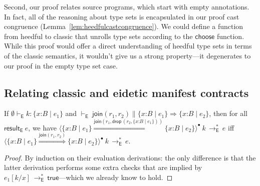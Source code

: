 \documentclass[9pt]{extarticle}
\newcommand{\ottnt}[1]{\mathit{#1}}
\newcommand{\ottsym}[1]{#1}
\begin{document}
{Second, our proof relates source programs, which start with empty
annotations. In fact, all of the reasoning about type sets is encapsulated
in our proof cast congruence\iffull
(Lemma~\ref{lem:heedfulcastcongruence})\fi. 
We could define a function from heedful \lambdah to classic \lambdah
that unrolls type sets according to the $ \mathsf{choose} $ function. While
this proof would offer a direct understanding of heedful \lambdah
type sets in terms of the classic semantics, it wouldn't give us a
strong property---it degenerates to our proof in the empty type set
case.

\subsection{Relating  classic and eidetic manifest contracts}
\label{sec:eideticlr}

\fi}

\begin{lemma}
  \label{lem:eideticcoercionidempotent}
  If $ \emptyset   \vdash _{  \mathsf{E}  }  \ottnt{k}  :   \{ \mathit{x} \mathord{:} \ottnt{B} \mathrel{\mid} \ottnt{e_{{\mathrm{1}}}} \}  $ and $ \mathord{  \vdash _{  \mathsf{E}  } }~  \mathsf{join} ( \ottnt{r_{{\mathrm{1}}}} , \ottnt{r_{{\mathrm{2}}}} )    \mathrel{\parallel}    \{ \mathit{x} \mathord{:} \ottnt{B} \mathrel{\mid} \ottnt{e_{{\mathrm{1}}}} \}   \Rightarrow   \{ \mathit{x} \mathord{:} \ottnt{B} \mathrel{\mid} \ottnt{e_{{\mathrm{2}}}} \}  $, then for all $ \mathsf{result} _{  \mathsf{E}  }~ \ottnt{e} $, we have
  $ \langle   \{ \mathit{x} \mathord{:} \ottnt{B} \mathrel{\mid} \ottnt{e_{{\mathrm{1}}}} \}   \mathord{ \overset{  \mathsf{join} ( \ottnt{r_{{\mathrm{1}}}} , \mathsf{drop} \, \ottsym{(}  \ottnt{r_{{\mathrm{2}}}}  \ottsym{,}   \{ \mathit{x} \mathord{:} \ottnt{B} \mathrel{\mid} \ottnt{e_{{\mathrm{1}}}} \}   \ottsym{)} )  }{\Rightarrow} }   \{ \mathit{x} \mathord{:} \ottnt{B} \mathrel{\mid} \ottnt{e_{{\mathrm{2}}}} \}   \rangle^{\bullet} ~  \ottnt{k}  \,  \longrightarrow ^{*}_{  \mathsf{E}  }  \, \ottnt{e}$ iff
  $ \langle   \{ \mathit{x} \mathord{:} \ottnt{B} \mathrel{\mid} \ottnt{e_{{\mathrm{1}}}} \}   \mathord{ \overset{  \mathsf{join} ( \ottnt{r_{{\mathrm{1}}}} , \ottnt{r_{{\mathrm{2}}}} )  }{\Rightarrow} }   \{ \mathit{x} \mathord{:} \ottnt{B} \mathrel{\mid} \ottnt{e_{{\mathrm{2}}}} \}   \rangle^{\bullet} ~  \ottnt{k}  \,  \longrightarrow ^{*}_{  \mathsf{E}  }  \, \ottnt{e}$.
\begin{proof}
    By induction on their evaluation derivations: the only difference
    is that the latter derivation performs some extra checks that are
    implied by $ \ottnt{e_{{\mathrm{1}}}}  [  \ottnt{k} / \mathit{x}  ]  \,  \longrightarrow ^{*}_{  \mathsf{E}  }  \,  \mathsf{true} $---which we already know to
    hold.
  \end{proof}
\end{lemma}
\end{document}
